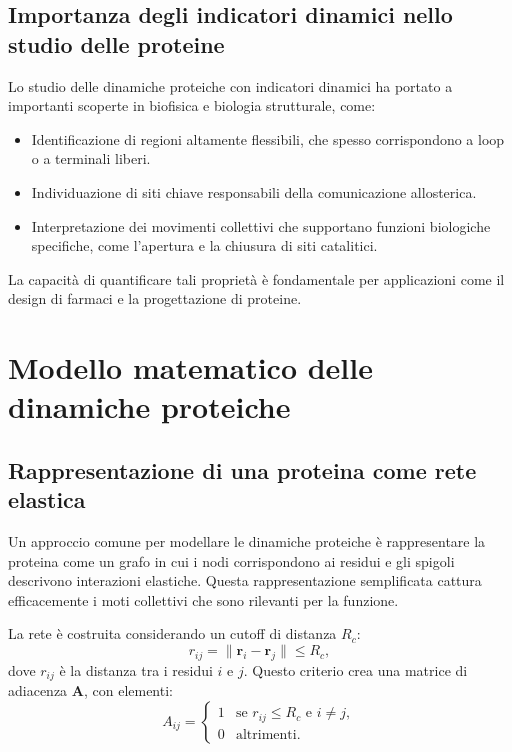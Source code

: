 \documentclass[Lau,binding=0.6cm,oneside,noexaminfo]{sapthesis}
\begin{document}
\subsection{Importanza degli indicatori dinamici nello studio delle proteine}
Lo studio delle dinamiche proteiche con indicatori dinamici ha portato a importanti scoperte in biofisica e biologia strutturale, come:
\begin{itemize}
    \item Identificazione di regioni altamente flessibili, che spesso corrispondono a loop o a terminali liberi.
    \item Individuazione di siti chiave responsabili della comunicazione allosterica.
    \item Interpretazione dei movimenti collettivi che supportano funzioni biologiche specifiche, come l’apertura e la chiusura di siti catalitici.
\end{itemize}
La capacità di quantificare tali proprietà è fondamentale per applicazioni come il design di farmaci e la progettazione di proteine.

\section{Modello matematico delle dinamiche proteiche}

\subsection{Rappresentazione di una proteina come rete elastica}
Un approccio comune per modellare le dinamiche proteiche è rappresentare la proteina come un grafo in cui i nodi corrispondono ai residui e gli spigoli descrivono interazioni elastiche. Questa rappresentazione semplificata cattura efficacemente i moti collettivi che sono rilevanti per la funzione.

La rete è costruita considerando un cutoff di distanza $R_c$:
\begin{equation}
r_{ij} = \|\mathbf{r}_i - \mathbf{r}_j\| \leq R_c,
\end{equation}
dove $r_{ij}$ è la distanza tra i residui $i$ e $j$. Questo criterio crea una matrice di adiacenza $\mathbf{A}$, con elementi:
\begin{equation}
A_{ij} =
\begin{cases}
1 & \text{se } r_{ij} \leq R_c \text{ e } i \neq j, \\
0 & \text{altrimenti.}
\end{cases}
\end{equation}
\end{document}
